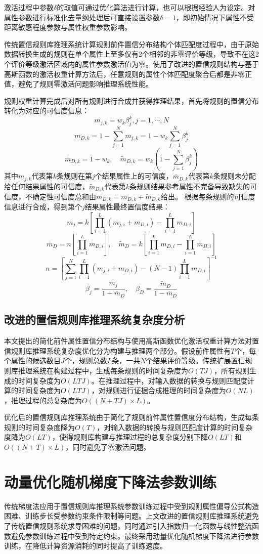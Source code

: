 \documentclass{cjc}
\begin{document}
激活过程中参数$\delta$的取值可通过优化算法进行计算，也可以根据经验人为设定。对属性参数进行标准化去量纲处理后可直接设置参数$\delta=1$，即初始情况下属性不受距离敏感程度参数与属性权重参数影响。

传统置信规则库推理系统计算规则前件置信分布结构个体匹配度过程中，由于原始数据转换生成的规则在单个属性上至多仅有2个相邻的非零评价等级，导致不在这2个评价等级激活区域内的属性参数激活值为零。使用了改进的置信规则结构与基于高斯函数的激活权重计算方法后，任意规则的属性个体匹配度聚合后都是非零正值，避免了规则零激活问题影响推理系统性能。

规则权重计算完成后对所有规则进行合成并获得推理结果，首先将规则的置信分布转化为对应的可信度信息：
$$m_{j,k}=w_k\beta_j^k,j=1,\cdots,N$$
$$m_{D,k}=1-\sum_{j=1}^Nm_{j,k}=1-w_k\sum_{j=1}^{N}\beta_j^k$$
$$\overline{m}_{D,k}=1-w_k,\quad\widetilde{m}_{D,k}=w_k(1-\sum_{j=1}^N\beta_j^k)$$
其中$m_{j,k}$代表第$k$条规则在第$j$个结果属性上的可信度，$\overline{m}_{D,k}$代表第$k$条规则未分配给任何结果属性的可信度，$\widetilde{m}_{D,k}$代表第$k$条规则结果参考属性不完备导致缺失的可信度，不确定性可信度总和由$m_{D,k}=\overline{m}_{D,k}+\widetilde{m}_{D,k}$给出。
根据每条规则的可信度信息进行合成，得到第个$j$结果属性最终置信度结果：
$$m_j=k[\prod_{i=1}^L(m_{j,i}+m_{D,i})-\prod_{i=1}^Lm_{D,i}]$$
$$\overline{m}_D=n[\prod_{i=1}^L\overline{m}_{D,i}],\quad\widetilde{m}_D=k[\prod_{i=1}^Lm_{D,i}-\prod_{i=1}^L\overline{m}_{H,i}]$$
$$n=[\sum_{j=1}^N\prod_{i=1}^L(m_{j,i}+m_{D,i})-(N-1)\prod_{i=1}^Lm_{D,i}]^{-1}$$
$$\beta_j=\frac{m_j}{1-\overline{m}_D},\quad\beta_D=\frac{\widetilde{m}_D}{1-\overline{m}_D}$$
\subsection{改进的置信规则库推理系统复杂度分析}
本文提出的简化前件属性置信分布结构与使用高斯函数优化激活权重计算方法对置信规则库推理系统复杂度优化分为构建与推理两个部分。假设前件属性有$T$个，每个属性的候选数目$J$个，规则总数$L$条，一共$N$个结果评价等级。传统扩展置信规则库推理系统在构建过程中，生成每条规则的时间复杂度为$O(TJ)$，所有规则生成的时间复杂度为$O(LTJ)$。在推理过程中，对输入数据的转换与规则匹配度计算的时间复杂度为$O(LTJ)$，对规则进行证据合成推理的时间复杂度为$O(NL)$，推理过程的总复杂度为$O((N+TJ)\times L)$。

优化后的置信规则库推理系统由于简化了规则前件属性置信度分布结构，生成每条规则的时间复杂度降为$O(T)$，对输入数据的转换与规则匹配度计算的时间复杂度降为$O(LT)$，使得规则库构建与推理过程的总复杂度分别下降$O(LT)$和$O((N+T)\times L)$，同时避免了零激活问题。
\section{动量优化随机梯度下降法参数训练}
传统梯度法应用于置信规则库推理系统参数训练过程中受到规则属性偏导公式构造困难、训练步长受参数约束条件限制等问题。上文改进的置信规则库推理系统避免了传统置信规则系统求导困难的问题，同时通过引入指数归一化函数与线性整流函数避免参数训练过程中受到特定约束。最终采用动量优化随机梯度下降法进行参数训练，在降低计算资源消耗的同时提高了训练速度。
\end{document}
